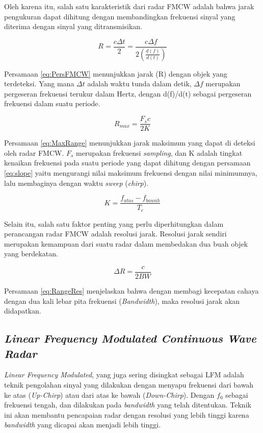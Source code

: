 Oleh karena itu, salah satu karakteristik dari radar FMCW adalah bahwa jarak pengukuran dapat dihitung dengan membandingkan frekuensi sinyal yang diterima dengan sinyal yang ditransmisikan.   

\begin{equation} 
	R = \frac{c \Delta{t}}{2} = \frac{c \Delta{f}}{2(\frac{d(f)}{d(t)})}
	\label{eq:PersFMCW}
\end{equation}

Persamaan \ref{eq:PersFMCW} menunjukkan jarak (R) dengan objek yang terdeteksi. Yang mana $\Delta{t}$ adalah waktu tunda dalam detik, $\Delta{f}$ merupakan pergeseran frekuensi terukur dalam Hertz, dengan d(f)/d(t) sebagai pergeseran frekuensi dalam suatu periode. 

\begin{equation}
	R_{max} = \frac{F_{s} c}{2 K}
	\label{eq:MaxRange}
\end{equation}

Persamaan \ref{eq:MaxRange} menunjukkan jarak maksimum yang dapat di deteksi oleh radar FMCW. $F_{s}$ merupakan frekuensi \textit{sampling}, dan K adalah tingkat kenaikan frekuensi pada suatu periode yang dapat dihitung dengan persamaan \ref{eq:slope} yaitu mengurangi nilai maksimum frekuensi dengan nilai minimumnya, lalu membaginya dengan waktu \textit{sweep} (\textit{chirp}).

\begin{equation}
	K = \frac{f_{atas} - f_{bawah}}{T_{c}}
	\label{eq:slope}
\end{equation}

Selain itu, salah satu faktor penting yang perlu diperhitungkan dalam perancangan radar FMCW adalah resolusi jarak. Resolusi jarak sendiri merupakan kemampuan dari suatu radar dalam membedakan dua buah objek yang berdekatan.

\begin{equation}
	\Delta{R} = \frac{c}{2 BW}
	\label{eq:RangeRes}
\end{equation}

Persamaan \ref{eq:RangeRes} menjelaskan bahwa dengan membagi kecepatan cahaya dengan dua kali lebar pita frekuensi (\textit{Bandwidth}), maka resolusi jarak akan didapatkan.

\subsection{\textit{Linear Frequency Modulated Continuous Wave Radar}}
\textit{Linear Frequency Modulated}, yang juga sering disingkat sebagai LFM adalah teknik pengolahan sinyal yang dilakukan dengan menyapu frekuensi dari bawah ke atas (\textit{Up-Chirp}) atau dari atas ke bawah (\textit{Down-Chirp}). Dengan $f_{0}$ sebagai frekuensi tengah, dan dilakukan pada \textit{bandwidth} yang telah ditentukan. Teknik ini akan membantu pencapaian radar dengan resolusi yang lebih tinggi karena \textit{bandwidth} yang dicapai akan menjadi lebih tinggi.

